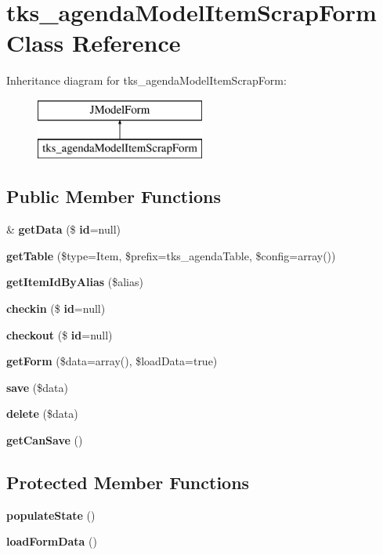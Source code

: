 \section{tks\+\_\+agenda\+Model\+Item\+Scrap\+Form Class Reference}
\label{classtks__agenda_model_item_scrap_form}
Inheritance diagram for tks\+\_\+agenda\+Model\+Item\+Scrap\+Form\+:\begin{figure}[H]
\begin{center}
\leavevmode
\includegraphics[height=2.000000cm]{classtks__agenda_model_item_scrap_form}
\end{center}
\end{figure}
\subsection*{Public Member Functions}
\begin{DoxyCompactItemize}
\item 
\& \textbf{ get\+Data} (\$\textbf{ id}=null)
\item 
\textbf{ get\+Table} (\$type=\textquotesingle{}Item\textquotesingle{}, \$prefix=\textquotesingle{}tks\+\_\+agenda\+Table\textquotesingle{}, \$config=array())
\item 
\textbf{ get\+Item\+Id\+By\+Alias} (\$alias)
\item 
\textbf{ checkin} (\$\textbf{ id}=null)
\item 
\textbf{ checkout} (\$\textbf{ id}=null)
\item 
\textbf{ get\+Form} (\$data=array(), \$load\+Data=true)
\item 
\textbf{ save} (\$data)
\item 
\textbf{ delete} (\$data)
\item 
\textbf{ get\+Can\+Save} ()
\end{DoxyCompactItemize}
\subsection*{Protected Member Functions}
\begin{DoxyCompactItemize}
\item 
\textbf{ populate\+State} ()
\item 
\textbf{ load\+Form\+Data} ()
\end{DoxyCompactItemize}


